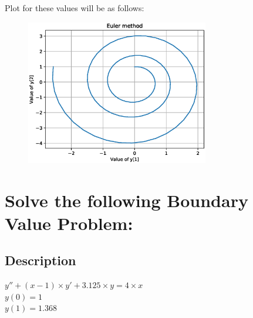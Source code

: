 \documentclass[a4paper,10pt]{article}
\begin{document}
Plot for these values will be as follows:
\begin{figure}[ht]
\includegraphics[width=8cm]{1_1.eps}
\end{figure}

\section{Solve the following Boundary Value Problem:}
\subsection{Description}
$y''+ (x-1)\times y'+ 3.125 \times y = 4\times x$\\
$y(0) = 1$\\
$y(1) = 1.368$
\end{document}
